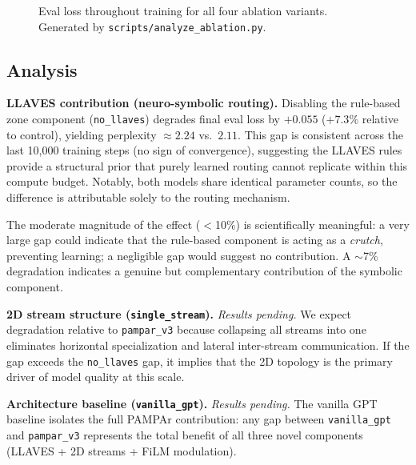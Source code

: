\documentclass[11pt,a4paper]{article}
\begin{document}
\begin{figure}[h]
\centering
{}
\caption{Eval loss throughout training for all four ablation variants.
Generated by \texttt{scripts/analyze\_ablation.py}.}
\label{fig:ablation_curves}
\end{figure}

\subsection{Analysis}

\textbf{LLAVES contribution (neuro-symbolic routing).}
Disabling the rule-based zone component (\texttt{no\_llaves}) degrades final
eval loss by $+0.055$ ($+7.3\%$ relative to control), yielding perplexity
$\approx2.24$ vs.\ $2.11$.  This gap is consistent across the last 10,000
training steps (no sign of convergence), suggesting the LLAVES rules provide
a structural prior that purely learned routing cannot replicate within this
compute budget.  Notably, both models share identical parameter counts, so
the difference is attributable solely to the routing mechanism.

The moderate magnitude of the effect ($<$10\%) is scientifically
meaningful: a very large gap could indicate that the rule-based component is
acting as a \emph{crutch}, preventing learning; a negligible gap would suggest
no contribution.  A $\sim$7\% degradation indicates a genuine but
complementary contribution of the symbolic component.

\textbf{2D stream structure (\texttt{single\_stream}).}
\textit{Results pending.}  We expect degradation relative to \texttt{pampar\_v3}
because collapsing all streams into one eliminates horizontal specialization
and lateral inter-stream communication.  If the gap exceeds the
\texttt{no\_llaves} gap, it implies that the 2D topology is the primary
driver of model quality at this scale.

\textbf{Architecture baseline (\texttt{vanilla\_gpt}).}
\textit{Results pending.}  The vanilla GPT baseline isolates the full
PAMPAr contribution: any gap between \texttt{vanilla\_gpt} and
\texttt{pampar\_v3} represents the total benefit of all three novel components
(LLAVES + 2D streams + FiLM modulation).
\end{document}
